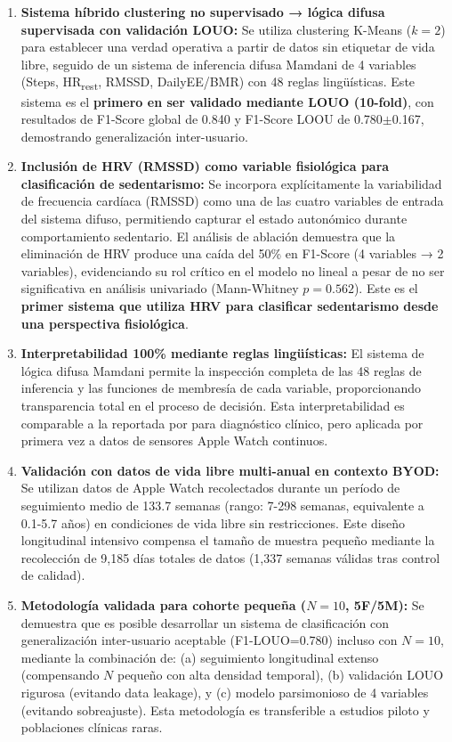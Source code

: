 \begin{enumerate}
    \item \textbf{Sistema híbrido clustering no supervisado → lógica difusa supervisada con validación LOUO:} Se utiliza clustering K-Means ($k=2$) para establecer una verdad operativa a partir de datos sin etiquetar de vida libre, seguido de un sistema de inferencia difusa Mamdani de 4 variables (Steps, HR\textsubscript{rest}, RMSSD, DailyEE/BMR) con 48 reglas lingüísticas. Este sistema es el \textbf{primero en ser validado mediante LOUO (10-fold)}, con resultados de F1-Score global de 0.840 y F1-Score LOOU de 0.780$\pm$0.167, demostrando generalización inter-usuario.
    
    \item \textbf{Inclusión de HRV (RMSSD) como variable fisiológica para clasificación de sedentarismo:} Se incorpora explícitamente la variabilidad de frecuencia cardíaca (RMSSD) como una de las cuatro variables de entrada del sistema difuso, permitiendo capturar el estado autonómico durante comportamiento sedentario. El análisis de ablación demuestra que la eliminación de HRV produce una caída del 50\% en F1-Score (4 variables → 2 variables), evidenciando su rol crítico en el modelo no lineal a pesar de no ser significativa en análisis univariado (Mann-Whitney $p=0.562$). Este es el \textbf{primer sistema que utiliza HRV para clasificar sedentarismo desde una perspectiva fisiológica}.
    
    \item \textbf{Interpretabilidad 100\% mediante reglas lingüísticas:} El sistema de lógica difusa Mamdani permite la inspección completa de las 48 reglas de inferencia y las funciones de membresía de cada variable, proporcionando transparencia total en el proceso de decisión. Esta interpretabilidad es comparable a la reportada por \cite{Capitoli2025FuzzyXAI} para diagnóstico clínico, pero aplicada por primera vez a datos de sensores Apple Watch continuos.
    
    \item \textbf{Validación con datos de vida libre multi-anual en contexto BYOD:} Se utilizan datos de Apple Watch recolectados durante un período de seguimiento medio de 133.7 semanas (rango: 7-298 semanas, equivalente a 0.1-5.7 años) en condiciones de vida libre sin restricciones. Este diseño longitudinal intensivo \cite{Bolger2013} compensa el tamaño de muestra pequeño mediante la recolección de 9,185 días totales de datos (1,337 semanas válidas tras control de calidad).
    
    \item \textbf{Metodología validada para cohorte pequeña ($N=10$, 5F/5M):} Se demuestra que es posible desarrollar un sistema de clasificación con generalización inter-usuario aceptable (F1-LOUO=0.780) incluso con $N=10$, mediante la combinación de: (a) seguimiento longitudinal extenso (compensando $N$ pequeño con alta densidad temporal), (b) validación LOUO rigurosa (evitando data leakage), y (c) modelo parsimonioso de 4 variables (evitando sobreajuste). Esta metodología es transferible a estudios piloto y poblaciones clínicas raras.
\end{enumerate}

